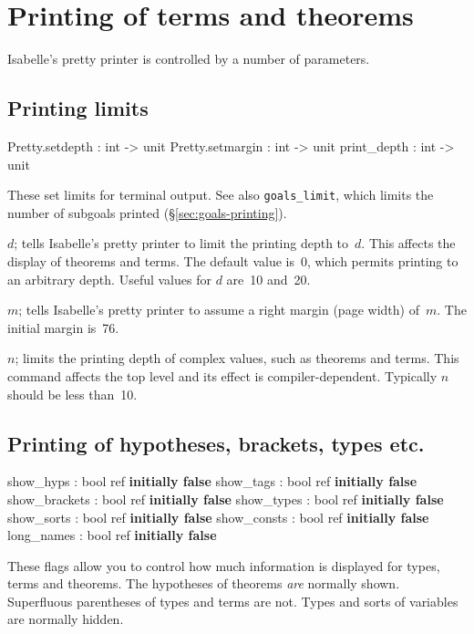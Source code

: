 \section{Printing of terms and theorems}\label{sec:printing-control}
Isabelle's pretty printer is controlled by a number of parameters.

\subsection{Printing limits}
\begin{ttbox} 
Pretty.setdepth  : int -> unit
Pretty.setmargin : int -> unit
print_depth      : int -> unit
\end{ttbox}
These set limits for terminal output.  See also {\tt goals_limit},
which limits the number of subgoals printed
(\S\ref{sec:goals-printing}).

\begin{ttdescription}
\item[\ttindexbold{Pretty.setdepth} \(d\);] tells Isabelle's pretty printer to
  limit the printing depth to~$d$.  This affects the display of theorems and
  terms.  The default value is~0, which permits printing to an arbitrary
  depth.  Useful values for $d$ are~10 and~20.

\item[\ttindexbold{Pretty.setmargin} \(m\);]  
  tells Isabelle's pretty printer to assume a right margin (page width)
  of~$m$.  The initial margin is~76.

\item[\ttindexbold{print_depth} \(n\);]  
  limits the printing depth of complex \ML{} values, such as theorems and
  terms.  This command affects the \ML{} top level and its effect is
  compiler-dependent.  Typically $n$ should be less than~10.
\end{ttdescription}


\subsection{Printing of hypotheses, brackets, types etc.}
\begin{ttbox} 
show_hyps     : bool ref \hfill{\bf initially false}
show_tags     : bool ref \hfill{\bf initially false}
show_brackets : bool ref \hfill{\bf initially false}
show_types    : bool ref \hfill{\bf initially false}
show_sorts    : bool ref \hfill{\bf initially false}
show_consts   : bool ref \hfill{\bf initially false}
long_names    : bool ref \hfill{\bf initially false}
\end{ttbox}
These flags allow you to control how much information is displayed for
types, terms and theorems.  The hypotheses of theorems \emph{are}
normally shown.  Superfluous parentheses of types and terms are not.
Types and sorts of variables are normally hidden.

